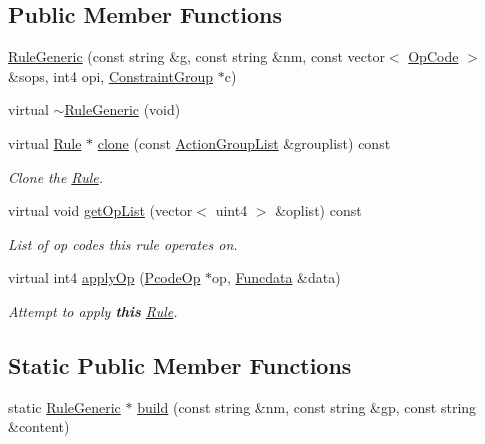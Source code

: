 \subsection*{Public Member Functions}
\begin{DoxyCompactItemize}
\item 
\mbox{\hyperlink{class_rule_generic_a60ed32c688c4a4c42a0a57ed779fc296}{Rule\+Generic}} (const string \&g, const string \&nm, const vector$<$ \mbox{\hyperlink{opcodes_8hh_abeb7dfb0e9e2b3114e240a405d046ea7}{Op\+Code}} $>$ \&sops, int4 opi, \mbox{\hyperlink{class_constraint_group}{Constraint\+Group}} $\ast$c)
\item 
virtual \mbox{\hyperlink{class_rule_generic_ae805742f3a547956f54e80b4e0be4d51}{$\sim$\+Rule\+Generic}} (void)
\item 
virtual \mbox{\hyperlink{class_rule}{Rule}} $\ast$ \mbox{\hyperlink{class_rule_generic_a98b2f92f8bcfebd473dd4e27fd183815}{clone}} (const \mbox{\hyperlink{class_action_group_list}{Action\+Group\+List}} \&grouplist) const
\begin{DoxyCompactList}\small\item\em Clone the \mbox{\hyperlink{class_rule}{Rule}}. \end{DoxyCompactList}\item 
virtual void \mbox{\hyperlink{class_rule_generic_a76ff5779a40a75ebdd0d2b213a35f1ec}{get\+Op\+List}} (vector$<$ uint4 $>$ \&oplist) const
\begin{DoxyCompactList}\small\item\em List of op codes this rule operates on. \end{DoxyCompactList}\item 
virtual int4 \mbox{\hyperlink{class_rule_generic_a418ffba68e1d81dd69a70752617b7ebb}{apply\+Op}} (\mbox{\hyperlink{class_pcode_op}{Pcode\+Op}} $\ast$op, \mbox{\hyperlink{class_funcdata}{Funcdata}} \&data)
\begin{DoxyCompactList}\small\item\em Attempt to apply {\bfseries{this}} \mbox{\hyperlink{class_rule}{Rule}}. \end{DoxyCompactList}\end{DoxyCompactItemize}
\subsection*{Static Public Member Functions}
\begin{DoxyCompactItemize}
\item 
static \mbox{\hyperlink{class_rule_generic}{Rule\+Generic}} $\ast$ \mbox{\hyperlink{class_rule_generic_a19c6f4513d1efe03ed91342c2c83001e}{build}} (const string \&nm, const string \&gp, const string \&content)
\end{DoxyCompactItemize}

